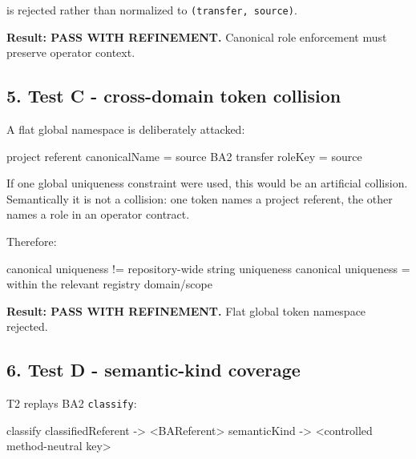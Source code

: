 \documentclass[
  10pt,
  a4paper,
]{article}
\newenvironment{Shaded}{}{}
\newcommand{\NormalTok}[1]{#1}
\begin{document}
is rejected rather than normalized to \texttt{(transfer,\ source)}.

\textbf{Result: PASS WITH REFINEMENT.} Canonical role enforcement must
preserve operator context.

\subsection{5. Test C - cross-domain token
collision}\label{test-c---cross-domain-token-collision}

A flat global namespace is deliberately attacked:

\begin{Shaded}
\begin{Highlighting}[]
\NormalTok{project referent canonicalName = source}
\NormalTok{BA2 transfer roleKey           = source}
\end{Highlighting}
\end{Shaded}

If one global uniqueness constraint were used, this would be an
artificial collision. Semantically it is not a collision: one token
names a project referent, the other names a role in an operator
contract.

Therefore:

\begin{Shaded}
\begin{Highlighting}[]
\NormalTok{canonical uniqueness != repository{-}wide string uniqueness}
\NormalTok{canonical uniqueness = within the relevant registry domain/scope}
\end{Highlighting}
\end{Shaded}

\textbf{Result: PASS WITH REFINEMENT.} Flat global token namespace
rejected.

\subsection{6. Test D - semantic-kind
coverage}\label{test-d---semantic-kind-coverage}

T2 replays BA2 \texttt{classify}:

\begin{Shaded}
\begin{Highlighting}[]
\NormalTok{classify}
\NormalTok{  classifiedReferent {-}\textgreater{} \textless{}BAReferent\textgreater{}}
\NormalTok{  semanticKind       {-}\textgreater{} \textless{}controlled method{-}neutral key\textgreater{}}
\end{Highlighting}
\end{Shaded}
\end{document}
